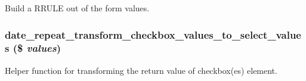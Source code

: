 \label{date__repeat__form_8inc_a72736d70f374c2a39e89c6988b28c724}
Build a RRULE out of the form values. \hypertarget{date__repeat__form_8inc_a1cc859e7eefd5ec7d2ac0e90f8d81468}{
\subsubsection[{date\_\-repeat\_\-transform\_\-checkbox\_\-values\_\-to\_\-select\_\-values}]{\setlength{\rightskip}{0pt plus 5cm}date\_\-repeat\_\-transform\_\-checkbox\_\-values\_\-to\_\-select\_\-values (\$ {\em values})}}
\label{date__repeat__form_8inc_a1cc859e7eefd5ec7d2ac0e90f8d81468}
Helper function for transforming the return value of checkbox(es) element.

